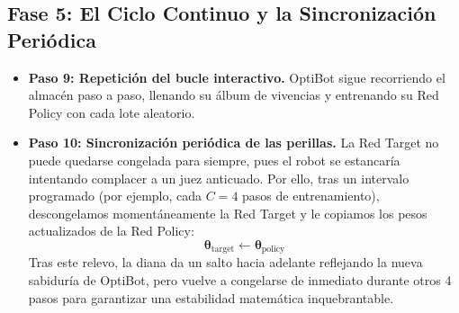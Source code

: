\subsection{Fase 5: El Ciclo Continuo y la Sincronización Periódica}
\begin{itemize}
  \item \textbf{Paso 9: Repetición del bucle interactivo.} OptiBot sigue recorriendo el almacén paso a paso, llenando su álbum de vivencias y entrenando su Red Policy con cada lote aleatorio.
  \item \textbf{Paso 10: Sincronización periódica de las perillas.} La Red Target no puede quedarse congelada para siempre, pues el robot se estancaría intentando complacer a un juez anticuado. Por ello, tras un intervalo programado (por ejemplo, cada $C = 4$ pasos de entrenamiento), descongelamos momentáneamente la Red Target y le copiamos los pesos actualizados de la Red Policy:
  \begin{equation}
    \boldsymbol{\theta}_{\text{target}} \leftarrow \boldsymbol{\theta}_{\text{policy}}
  \end{equation}
  Tras este relevo, la diana da un salto hacia adelante reflejando la nueva sabiduría de OptiBot, pero vuelve a congelarse de inmediato durante otros 4 pasos para garantizar una estabilidad matemática inquebrantable.
\end{itemize}

